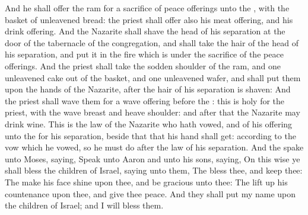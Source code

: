 \begin{biblechapter}
\verse And he shall offer the ram for a sacrifice of peace offerings unto the \LORD, with the basket of unleavened bread: the priest shall offer also his meat offering, and his drink offering.
\verse And the Nazarite shall shave the head of his separation at the door of the tabernacle of the congregation, and shall take the hair of the head of his separation, and put it in the fire which is under the sacrifice of the peace offerings.
\verse And the priest shall take the sodden shoulder of the ram, and one unleavened cake out of the basket, and one unleavened wafer, and shall put them upon the hands of the Nazarite, after the hair of his separation is shaven:
\verse And the priest shall wave them for a wave offering before the \LORD: this is holy for the priest, with the wave breast and heave shoulder: and after that the Nazarite may drink wine.
\verse This is the law of the Nazarite who hath vowed, and of his offering unto the \LORD for his separation, beside that that his hand shall get: according to the vow which he vowed, so he must do after the law of his separation.
 And the \LORD spake unto Moses, saying,
\verse Speak unto Aaron and unto his sons, saying, On this wise ye shall bless the children of Israel, saying unto them,
\verse The \LORD bless thee, and keep thee:
\verse The \LORD make his face shine upon thee, and be gracious unto thee:
\verse The \LORD lift up his countenance upon thee, and give thee peace.
\verse And they shall put my name upon the children of Israel; and I will bless them.
\end{biblechapter}

\columnbreak %


